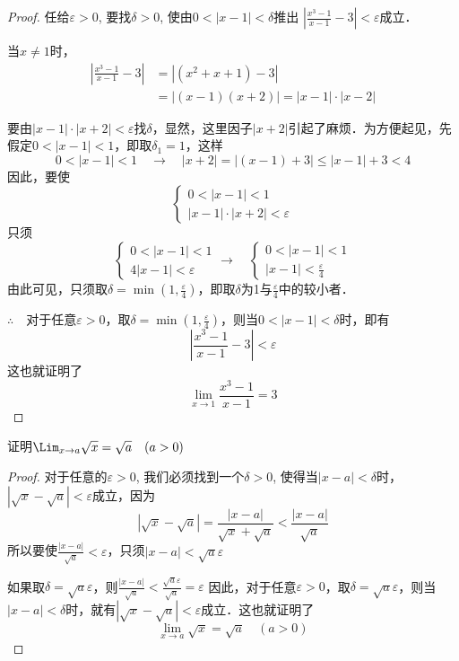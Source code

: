 \begin{proof}
    任给$\varepsilon>0$, 要找$\delta>0$, 使由$0<|x-1|<\delta$推出
    $\left|\frac{x^3-1}{x-1}-3\right|<\varepsilon$成立．

    当$x\ne 1$时，
\[\begin{split}
    \left|\frac{x^3-1}{x-1}-3\right|&=|(x^2+x+1)-3|\\
    &=|(x-1)(x+2)|=|x-1|\cdot |x-2|
\end{split}\]

要由$|x-1|\cdot |x+2|<\varepsilon$找$\delta$，显然，这里因子$|x+2|$引起了麻烦．为方便起见，先假定$0<|x-1|<1$，即取$\delta_1=1$，这样
\[0<|x-1|<1\quad\to \quad |x+2|=|(x-1)+3|\le |x-1|+3<4\]因此，要使
\[\begin{cases}
    0<|x-1|<1\\
    |x-1|\cdot |x+2|<\varepsilon
\end{cases}\]
只须
\[\begin{cases}
    0<|x-1|<1\\
    4|x-1|<\varepsilon
\end{cases}\to \quad \begin{cases}
    0<|x-1|<1\\
    |x-1|<\frac{\varepsilon}{4}
\end{cases}\]
由此可见，只须取$\delta=\min\left(1,\frac{\varepsilon}{4}\right)$，即取$\delta$为1与$\frac{\varepsilon}{4}$中的较小者．

$\therefore\quad $对于任意$\varepsilon>0$，取$\delta=\min\left(1,\frac{\varepsilon}{4}\right)$，则当$0<|x-1|<\delta$时，即有
\[\left|\frac{x^3-1}{x-1}-3\right|<\varepsilon\]
这也就证明了
\[\lim_{x\to 1}\frac{x^3-1}{x-1}=3\]
\end{proof}

\begin{example}
    证明$\Lim_{x\to a}\sqrt{x}=\sqrt{a}\quad (a>0)$
\end{example}

\begin{proof}
对于任意的$\varepsilon>0$, 我们必须找到一个$\delta>0$, 使得当$|x-a|<\delta$时，$|\sqrt{x}-\sqrt{a}|<\varepsilon$成立，因为
\[|\sqrt{x}-\sqrt{a}|=\frac{|x-a|}{\sqrt{x}+\sqrt{a}}<\frac{|x-a|}{\sqrt{a}}\]
所以要使$\frac{|x-a|}{\sqrt{a}}<\varepsilon$，只须$|x-a|<\sqrt{a}\varepsilon$

如果取$\delta=\sqrt{a}\varepsilon$，则$\frac{|x-a|}{\sqrt{a}}<\frac{\sqrt{a}\varepsilon}{\sqrt{a}}=\varepsilon$
因此，对于任意$\varepsilon>0$，取$\delta=\sqrt{a}\varepsilon$，则当$|x-a|<\delta$时，就有$|\sqrt{x}-\sqrt{a}|<\varepsilon$成立．这也就证明了
\[\lim_{x\to a}\sqrt{x}=\sqrt{a}\quad (a>0)\]
\end{proof}


